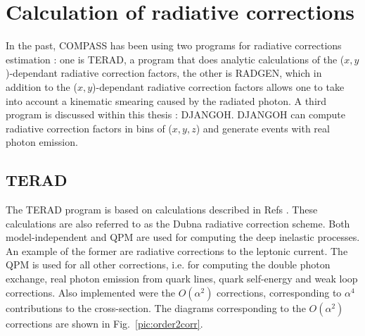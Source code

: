 
\chapter{Calculation of radiative corrections} %

\label{ch:Calculation} %


In the past, COMPASS has been using two programs for radiative corrections estimation : one is TERAD, a program that does analytic calculations of the ($x,y$)-dependant radiative correction factors, the other is RADGEN, which in addition to the ($x,y$)-dependant radiative correction factors allows one to take into account a kinematic smearing caused by the radiated photon. A third program is discussed within this thesis : DJANGOH. DJANGOH can compute radiative correction factors in bins of ($x,y,z$) and generate events with real photon emission.

\section{TERAD}

The TERAD program is based on calculations described in Refs \cite{TERAD1,TERAD2,TERAD3}. These calculations are also referred to as the Dubna radiative correction scheme. Both model-independent and QPM are used for computing the deep inelastic processes. An example of the former are radiative corrections to the leptonic current. The QPM is used for all other corrections, i.e. for computing the double photon exchange, real photon emission from quark lines, quark self-energy and weak loop corrections. Also implemented were the $O(\alpha^2)$ corrections, corresponding to $\alpha^4$ contributions to the cross-section. The diagrams corresponding to the $O(\alpha^2)$ corrections are shown in Fig.~\ref{pic:order2corr}.

